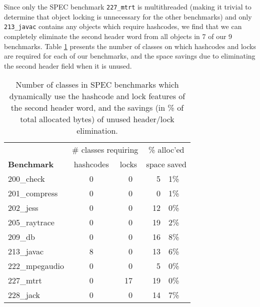 \documentclass[preprint]{acmconf}
\begin{document}
Since only the SPEC benchmark {\tt 227\_mtrt} is multithreaded
(making it trivial to determine that object locking is unnecessary
for the other benchmarks)
and only {\tt 213\_javac} contains
any objects which require hashcodes, we find that we can completely
eliminate the second header word from all objects in 7 of our 9 benchmarks.
Table \ref{tab:hashlock-opt} presents the number of classes on which
hashcodes and locks are required for each of our benchmarks, and the
space savings due to eliminating the second header field when it is
unused.
\begin{table}
\begin{tabular}{lccr@{.}l}
&\multicolumn{2}{c}{\# classes requiring}&\multicolumn{2}{c}{\% alloc'ed}\\
\bf Benchmark & hashcodes&locks & \multicolumn{2}{c}{space saved} \\\hline
200\_check	&   0 &   ~0   &  5&1\% \\
201\_compress	&   0 &   ~0   &  0&1\% \\
202\_jess	&   0 &   ~0   & 12&0\% \\
205\_raytrace	&   0 &   ~0   & 19&2\% \\
209\_db 	&   0 &   ~0   & 16&8\% \\
213\_javac	&   8 &   ~0   & 13&6\% \\
222\_mpegaudio	&   0 &   ~0   &  5&0\% \\
227\_mtrt	&   0 &   17   & 19&0\% \\
228\_jack	&   0 &   ~0   & 14&7\% \\
\end{tabular}
\caption{Number of classes in SPEC benchmarks which dynamically use
  the hashcode and lock features of the second header word,
  and the savings (in \% of total allocated bytes) of unused header/lock
  elimination.}
\label{tab:hashlock-opt}
\end{table}
\end{document}
